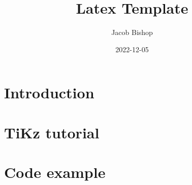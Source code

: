 \documentclass{article}
\title{Latex Template}
\author{Jacob Bishop}
\date{2022-12-05}
\begin{document}
\maketitle

\section{Introduction}



\newpage

\section{TiKz tutorial}



\newpage

\section{Code example}


\end{document}
